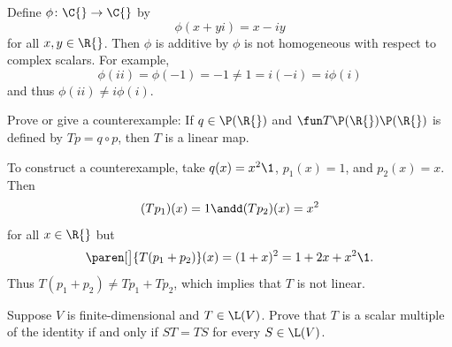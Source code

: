 \pagebreak[3]

\begin{Solution}
Define $\phi \colon \C{} \to \C{}$ by
\[
\phi(x + yi) = x - iy
\]
for all $x, y \in \R{}$. Then $\phi$ is additive by $\phi$ is not homogeneous with respect to complex scalars. For example,
\[
\phi(i i) = \phi(-1) = -1 \ne 1 = i(-i) = i \phi(i)
\]
and thus $\phi(ii) \ne i \phi(i)$.
\end{Solution}

\exercise
Prove or give a counterexample: If $q \in \P(\R{})$ and $\fun T {\P(\R{})} {\P(\R{})}$ is defined by $Tp = q \circ p$, then $T$ is a linear map.

\begin{Solution}
To construct a counterexample, take $q(x) = x^2\1$, $p_1(x) = 1$, and $p_2(x) = x$. Then
\[
(Tp_1)(x) = 1 \andd (Tp_2)(x) = x^2
\]
for all $x \in \R{}$ but
\[
\paren[\big]{ T(p_1+ p_2) }(x) = (1 + x)^2 = 1 + 2x + x^2\1.
\]
Thus $T(p_1 + p_2) \ne Tp_1 + Tp_2$, which implies that $T$ is not linear.
\end{Solution}

\exercise
Suppose $V$ is finite-dimensional and $T \in \L(V)$.  Prove that $T$ is a
scalar multiple of the identity if and  only if $ST = TS$ for every $S \in \L(V)$.

